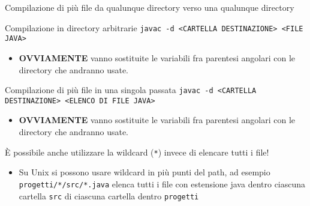 \documentclass[xcolor=dvipsnames,presentation]{beamer}
\begin{document}
\begin{frame}{Compilazione di più file da qualunque directory verso una qualunque directory}
  \begin{block}{Compilazione in directory arbitrarie}
    \texttt{javac {\color{red}-d <CARTELLA DESTINAZIONE>} <FILE JAVA>}
    \begin{itemize}
      \item \textbf{OVVIAMENTE} vanno sostituite le variabili fra parentesi angolari con le
directory che andranno usate.
    \end{itemize}
  \end{block}
  \begin{block}{Compilazione di più file in una singola passata}
    \texttt{javac -d <CARTELLA DESTINAZIONE> {\color{red}<ELENCO DI FILE JAVA>}}
    \begin{itemize}
      \item \textbf{OVVIAMENTE} vanno sostituite le variabili fra parentesi angolari con le
directory che andranno usate.
    \end{itemize}
  \end{block}
  È possibile anche utilizzare la wildcard (\texttt{*}) invece di elencare tutti i file!
  \begin{itemize}
    \item Su Unix si possono usare wildcard in più punti del path, ad esempio
\texttt{progetti/*/src/*.java} elenca tutti i file con estensione java dentro ciascuna cartella
\texttt{src} di ciascuna cartella dentro \texttt{progetti}
  \end{itemize}
\end{frame}
\end{document}
